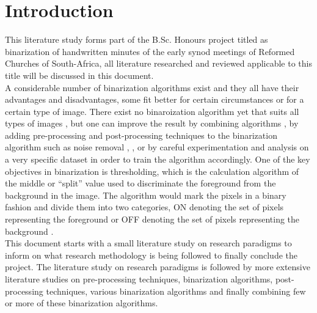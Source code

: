 \documentclass[11pt]{article}
\begin{document}
	

    \renewcommand{\cftsecleader}{\cftdotfill{\cftdotsep}} %
    \tableofcontents
    \thispagestyle{empty}
    \clearpage

    \listoffigures
    \thispagestyle{empty}
    \clearpage

    \setcounter{page}{1}

	\section{Introduction}
		This literature study forms part of the B.Sc. Honours project titled as binarization of handwritten minutes of the early synod meetings of Reformed Churches of South-Africa, all literature researched and reviewed applicable to this title will be discussed in this document.\\

		A considerable number of binarization algorithms exist and they all have their advantages and disadvantages, some fit better for certain circumstances or for a certain type of image. There exist no binaroization algorithm yet that suits all types of images \cite{lins2015binarizing}, but one can improve the result by combining algorithms \cite{ntogas2008binarization}, by adding pre-processing and post-processing techniques to the binarization algorithm such as noise removal \cite{agrawal2011stroke}, \cite{lins2015binarizing}, or by careful experimentation and analysis on a very specific dataset in order to train the algorithm accordingly. One of the key objectives in binarization is thresholding, which is the calculation algorithm of the middle or ``split'' value used to discriminate the foreground from the background in the image. The algorithm would mark the pixels in a binary fashion and divide them into two categories, ON denoting the set of pixels representing the foreground or OFF denoting the set of pixels representing the background \cite{o1995document}.\\

		This document starts with a small literature study on research paradigms to inform on what research methodology is being followed to finally conclude the project. The literature study on research paradigms is followed by more extensive literature studies on pre-processing techniques, binarization algorithms, post-processing techniques, various binarization algorithms and finally combining few or more of these binarization algorithms.\\
\end{document}
